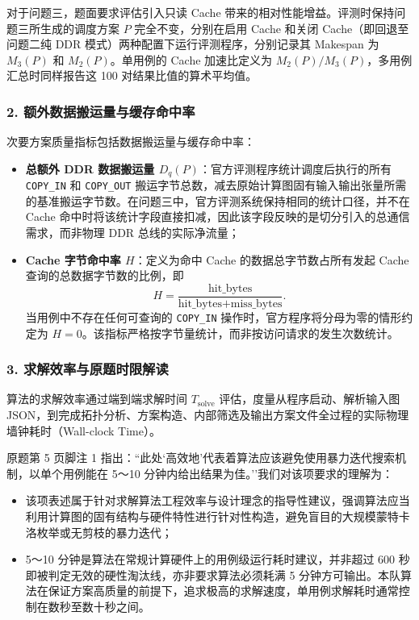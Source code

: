 \documentclass[anonymous,notoc]{gmcm2026}
\providecommand{\tightlist}{\setlength{\itemsep}{0pt}\setlength{\parskip}{0pt}}
\begin{document}
对于问题三，题面要求评估引入只读 Cache 带来的相对性能增益。评测时保持问题三所生成的调度方案 \(P\) 完全不变，分别在启用 Cache 和关闭 Cache（即回退至问题二纯 DDR 模式）两种配置下运行评测程序，分别记录其 Makespan 为 \(M_3(P)\) 和 \(M_2(P)\)。单用例的 Cache 加速比定义为 \(M_2(P) / M_3(P)\)，多用例汇总时同样报告这 100 对结果比值的算术平均值。

\subsubsection{2. 额外数据搬运量与缓存命中率}

次要方案质量指标包括数据搬运量与缓存命中率：

\begin{itemize}
\tightlist
\item
  \textbf{总额外 DDR 数据搬运量 \(D_q(P)\)}：官方评测程序统计调度后执行的所有 \texttt{COPY\_IN} 和 \texttt{COPY\_OUT} 搬运字节总数，减去原始计算图固有输入输出张量所需的基准搬运字节数。在问题三中，官方评测系统保持相同的统计口径，并不在 Cache 命中时将该统计字段直接扣减，因此该字段反映的是切分引入的总通信需求，而非物理 DDR 总线的实际净流量；
\item
  \textbf{Cache 字节命中率 \(H\)}：定义为命中 Cache 的数据总字节数占所有发起 Cache 查询的总数据字节数的比例，即 \[H = \frac{\text{hit\_bytes}}{\text{hit\_bytes} + \text{miss\_bytes}}.\] 当用例中不存在任何可查询的 \texttt{COPY\_IN} 操作时，官方程序将分母为零的情形约定为 \(H = 0\)。该指标严格按字节量统计，而非按访问请求的发生次数统计。
\end{itemize}

\subsubsection{3. 求解效率与原题时限解读}

算法的求解效率通过端到端求解时间 \(T_{\text{solve}}\) 评估，度量从程序启动、解析输入图 JSON，到完成拓扑分析、方案构造、内部筛选及输出方案文件全过程的实际物理墙钟耗时（Wall-clock Time）。

原题第 5 页脚注 1 指出：``此处`高效地'代表着算法应该避免使用暴力迭代搜索机制，以单个用例能在 5～10 分钟内给出结果为佳。''我们对该项要求的理解为：

\begin{itemize}
\tightlist
\item
  该项表述属于针对求解算法工程效率与设计理念的指导性建议，强调算法应当利用计算图的固有结构与硬件特性进行针对性构造，避免盲目的大规模蒙特卡洛枚举或无剪枝的暴力迭代；
\item
  5～10 分钟是算法在常规计算硬件上的用例级运行耗时建议，并非超过 600 秒即被判定无效的硬性淘汰线，亦非要求算法必须耗满 5 分钟方可输出。本队算法在保证方案高质量的前提下，追求极高的求解速度，单用例求解耗时通常控制在数秒至数十秒之间。
\end{itemize}
\end{document}
